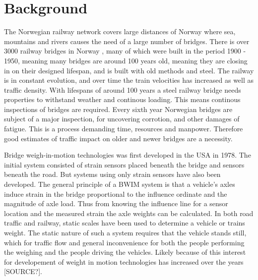 \section{Background}
The Norwegian railway network covers large distances of Norway where sea, mountains and rivers causes the need of a large number of bridges. There is over 3000 railway bridges in Norway \cite{norsk_jernbane}, many of which were built in the period 1900 - 1950, meaning many bridges are around 100 years old, meaning they are closing in on their designed lifespan, and is built with old methods and steel. The railway is in constant evolution, and over time the train velocities has increased as well as traffic density. With lifespans of around 100 years a steel railway bridge needs properties to withstand weather and continous loading. This means continous inspections of bridges are required. Every sixth year Norwegian bridges are subject of a major inspection, for uncovering corrotion, and other damages of fatigue. This is a process demanding time, resources and manpower. Therefore good estimates of traffic impact on older and newer bridges are a necessity.

Bridge weigh-in-motion technologies was first developed in the USA in 1978. The initial system consisted of strain sensors placed beneath the bridge and sensors beneath the road. But systems using only strain sensors have also been developed. The general principle of a BWIM system is that a vehicle's axles induce strain in the bridge proportional to the influence ordinate and the magnitude of axle load. Thus from knowing the influence line for a sensor location and the measured strain the axle weights can be calculated.
In both road traffic and railway, static scales have been used to determine a vehicle or trains weight. The static nature of such a system requires that the vehicle stands still, which for traffic flow and general inconvenience for both the people performing the weighing and the people driving the vehicles. Likely because of this interest for developement of weight in motion technologies has increased over the years [SOURCE?].

